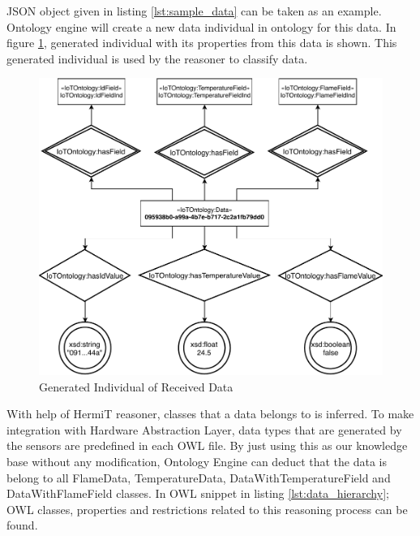 

JSON object given in listing \ref{lst:sample_data} can be taken as an example. Ontology engine will create a new data individual in ontology for this data. In figure \ref{fig:data_ontology}, generated individual with its properties from this data is shown. This generated individual is used by the reasoner to classify data.
\begin{figure}[H]
  \centering
  \includegraphics[width=\textwidth,height=\textheight,keepaspectratio]{figures/sample_data_ontology.pdf}
  \caption[Sample Ontology Representation of Data]{Generated Individual of Received Data}\label{fig:data_ontology}
\end{figure}

With help of HermiT reasoner, classes that a data belongs to is inferred. To make integration with Hardware Abstraction Layer, data types that are generated by the sensors are predefined in each OWL file. By just using this as our knowledge base without any modification, Ontology Engine can deduct that the data is belong to all FlameData, TemperatureData, DataWithTemperatureField and DataWithFlameField classes. In OWL snippet in listing \ref{lst:data_hierarchy}; OWL classes, properties and restrictions related to this reasoning process can be found.



